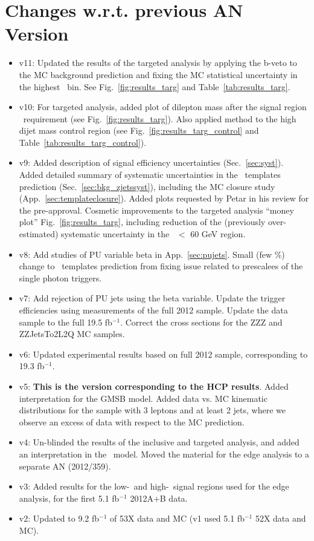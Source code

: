\section{Changes w.r.t. previous AN Version}
\label{sec:changes}

\begin{itemize}

\item v11: Updated the results of the targeted analysis by applying the b-veto to the MC background prediction and fixing the MC statistical uncertainty
in the highest \MET\ bin. See Fig.~\ref{fig:results_targ} and Table~\ref{tab:results_targ}.
\item v10: For targeted analysis, added plot of dilepton mass after the signal region \MET\ requirement (see Fig.~\ref{fig:results_targ}). Also applied method to the high dijet mass control region (see Fig.~\ref{fig:results_targ_control} and Table~\ref{tab:results_targ_control}).
\item v9: Added description of signal efficiency uncertainties (Sec.~\ref{sec:syst}). 
Added detailed summary of systematic uncertainties in the \MET\ templates prediction (Sec.~\ref{sec:bkg_zjetssyst}), including the MC closure study (App.~\ref{sec:templateclosure}).
Added plots requested by Petar in his review for the pre-approval. Cosmetic improvements to the targeted analysis ``money plot'' Fig.~\ref{fig:results_targ}, including
reduction of the (previously over-estimated) systematic uncertainty in the \MET\ $<$ 60 GeV region.
\item v8: Add studies of PU variable beta in App.~\ref{sec:pujets}. Small (few \%) change to \MET\ templates prediction from fixing issue related to prescalees of the single photon triggers.
\item v7: Add rejection of PU jets using the beta variable. Update the trigger efficiencies using measurements of the full 2012 sample. Update the data sample to the full 19.5 fb$^{-1}$. Correct the cross sections for the ZZZ and ZZJetsTo2L2Q MC samples.
\item v6: Updated experimental results based on full 2012 sample, corresponding to 19.3 fb$^{-1}$.
\item v5: {\bf This is the version corresponding to the HCP results}. Added interpretation for the GMSB model. %
Added data vs. MC kinematic distributions for the sample with 3 leptons and at least 2 jets, where we observe an excess of data with respect to the MC prediction. %
\item v4: Un-blinded the results of the inclusive and targeted analysis, and added an interpretation in the \wzmet\ model. Moved the material for the edge analysis to a separate AN (2012/359).
\item v3: Added results for the low-\MET\ and high-\MET\ signal regions used for the edge analysis, for the first 5.1 fb$^{-1}$ 2012A+B data.
\item v2: Updated to 9.2 fb$^{-1}$ of 53X data and MC (v1 used 5.1 fb$^{-1}$ 52X data and MC).

\end{itemize}
